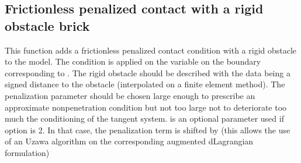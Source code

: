 \documentclass[a4paper,11pt,english]{sphinxmanual}
\begin{document}
\subsection{Frictionless penalized contact with a rigid obstacle brick}
\label{\detokenize{userdoc/model_contact_friction:frictionless-penalized-contact-with-a-rigid-obstacle-brick}}
\begin{sphinxVerbatim}[commandchars=\\\{\}]
         
          
\end{sphinxVerbatim}

This function adds a frictionless penalized contact condition
with a rigid obstacle to the model.
The condition is applied on the variable 
on the boundary corresponding to . The rigid obstacle should
be described with the data  being a signed distance to
the obstacle (interpolated on a finite element method).
The penalization parameter  should be chosen
large enough to prescribe an approximate non\sphinxhyphen{}penetration condition
but not too large not to deteriorate too much the conditioning of
the tangent system.  is an optional parameter used if option
is 2. In that case, the penalization term is shifted by  (this
allows the use of an Uzawa algorithm on the corresponding augmented
dLagrangian formulation)
\end{document}
